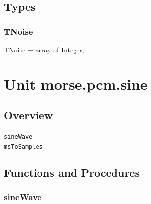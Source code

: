 \documentclass{report}
\newif\ifpdf
\begin{document}
\section{Types}
\ifpdf
\subsection*{\large{\textbf{TNoise}}\normalsize\hspace{1ex}\hrulefill}
\else
\subsection*{TNoise}
\fi
\label{morse.pcm.pinknoise-TNoise}
\begin{list}{}{
\setlength{\itemindent}{0cm}
\setlength{\listparindent}{0cm}
\setlength{\leftmargin}{\evensidemargin}
\addtolength{\leftmargin}{\tmplength}
\settowidth{\labelsep}{X}
\addtolength{\leftmargin}{\labelsep}
\setlength{\labelwidth}{\tmplength}
}
\item[\textbf{Declaration}\hfill]
\ifpdf
\begin{flushleft}
\fi
\begin{ttfamily}
TNoise = array of Integer;\end{ttfamily}

\ifpdf
\end{flushleft}
\fi

\end{list}
\chapter{Unit morse.pcm.sine}
\label{morse.pcm.sine}
\section{Overview}
\begin{description}
\item[\texttt{sineWave}]
\item[\texttt{msToSamples}]
\end{description}
\section{Functions and Procedures}
\ifpdf
\subsection*{\large{\textbf{sineWave}}\normalsize\hspace{1ex}\hrulefill}
\else
\end{document}
